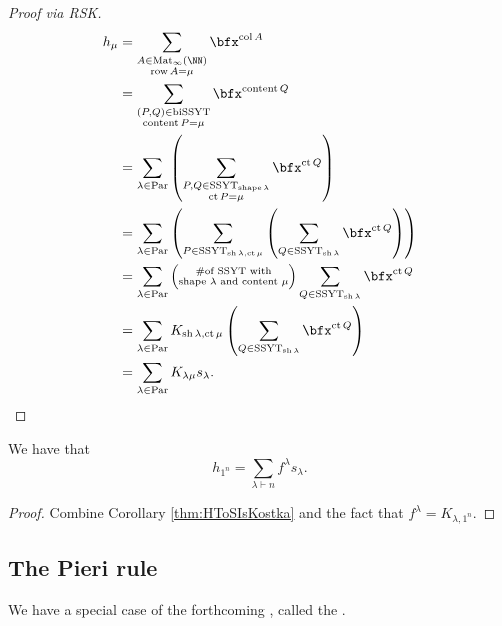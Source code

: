 \documentclass{article}
\DeclareMathOperator{\row}{row}
\DeclareMathOperator{\col}{col}
\DeclareMathOperator{\shape}{shape}
\DeclareMathOperator{\sh}{sh}
\DeclareMathOperator{\content}{content}
\DeclareMathOperator{\ct}{ct}
\DeclareMathOperator{\Par}{Par}
\DeclareMathOperator{\SSYT}{SSYT}
\DeclareMathOperator{\biSSYT}{biSSYT}
\DeclareMathOperator{\Mat}{Mat}
\begin{document}
\begin{proof}[Proof via RSK]
    \begin{align*}
        h_\mu 
        &= 
        \sum_{\substack{A\in\Mat_\infty(\NN)\\\row A=\mu}} 
        \bfx^{\col A}
        \\
        &=
        \sum_{\substack{(P,Q)\in\biSSYT\\\content P=\mu}} 
        \bfx^{\content Q}
        \\
        &=
        \sum_{\lambda\in\Par}
        \left(
            \sum_{\substack{P,Q\in\SSYT_{\shape \lambda}\\\ct P=\mu}} 
            \bfx^{\ct Q}
        \right)
        \\
        &=
        \sum_{\lambda\in\Par}
        \left(
            \sum_{P\in\SSYT_{\sh \lambda, \ct \mu}} 
            \left(
                \sum_{Q\in\SSYT_{\sh \lambda}} \bfx^{\ct Q}
            \right)
        \right) 
        \\
        &=
        \sum_{\lambda\in\Par}
        \left(
            \substack{\#\text{of SSYT with}\\\text{shape $\lambda$ and content $\mu$}}
        \right)
        \sum_{Q\in\SSYT_{\sh \lambda}} 
        \bfx^{\ct Q} 
        \\
        &= 
        \sum_{\lambda\in\Par} 
        K_{\sh\lambda,\ct\mu} 
        \left(\sum_{Q\in\SSYT_{\sh \lambda}} \bfx^{\ct Q}\right) 
        \\
        &= \sum_{\lambda\in\Par} K_{\lambda\mu} s_\lambda.
    \end{align*}
\end{proof}

\begin{corollary}
    We have that
    \[
        h_{1^n} = \sum_{\lambda \vdash n} f^\lambda s_\lambda.
    \]
\end{corollary}

\begin{proof}
    Combine Corollary \ref{thm:HToSIsKostka} and the fact that $f^\lambda = K_{\lambda,1^n}$.
\end{proof}

\subsection{The Pieri rule}

We have a special case of the forthcoming , called the .
\end{document}
